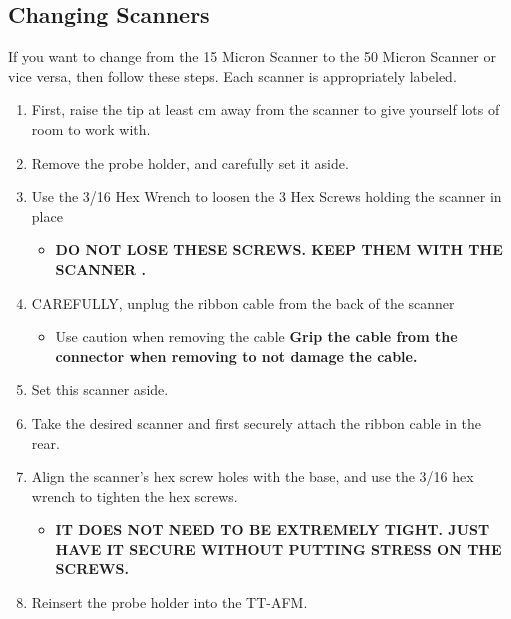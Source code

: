\documentclass{../lab}
\begin{document}
\subsection{Changing Scanners}
\label{subsec:ChangingScanners}

If you want to change from the 15 Micron Scanner to the 50 Micron Scanner or vice versa, then follow these steps. Each scanner is appropriately labeled.

\begin{enumerate}
    \item First, raise the tip at least cm away from the scanner to give yourself lots of room to work with.

    \item Remove the probe holder, and carefully set it aside.

    \item Use the 3/16 Hex Wrench to loosen the 3 Hex Screws holding the scanner in place

    \begin{itemize}
        \item \textbf{DO NOT LOSE THESE SCREWS. KEEP THEM WITH THE SCANNER .}
    \end{itemize}

    \item CAREFULLY, unplug the ribbon cable from the back of the scanner

    \begin{itemize}
        \item Use caution when removing the cable \textbf{Grip the cable from the connector when removing to not damage the cable.}
    \end{itemize}

    \item Set this scanner aside.

    \item Take the desired scanner and first securely attach the ribbon cable in the rear.

    \item Align the scanner's hex screw holes with the base, and use the 3/16 hex wrench to tighten the hex screws.

    \begin{itemize}
        \item \textbf{IT DOES NOT NEED TO BE EXTREMELY TIGHT. JUST HAVE IT SECURE WITHOUT PUTTING STRESS ON THE SCREWS.}
    \end{itemize}

    \item Reinsert the probe holder into the TT-AFM.

\end{enumerate}
\end{document}
